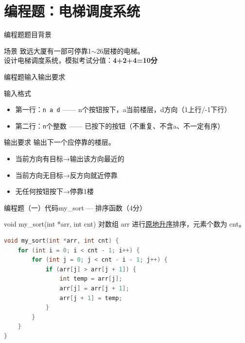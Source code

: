 \section{编程题：电梯调度系统}

\begin{frame}{编程题}{题目背景}
    \begin{exampleblock}{场景}
        \footnotesize 致远大厦有一部可停靠1$\sim$26层楼的电梯。\\
        设计电梯调度系统，模拟考试分值：\textbf{4+2+4=10分}
    \end{exampleblock}
\end{frame}

\begin{frame}{编程题}{输入输出要求}
    \begin{block}{输入格式}
        \footnotesize
        \begin{itemize}
            \setlength{\itemsep}{0pt}
            \item 第一行：\texttt{n a d} —— n个按钮按下，a当前楼层，d方向（1上行/-1下行）
            \item 第二行：\texttt{n}个整数 —— 已按下的按钮（不重复、不含a、不一定有序）
        \end{itemize}
    \end{block}
    \begin{block}{输出要求}
        \footnotesize 输出下一个应停靠的楼层。
        \begin{itemize}
            \setlength{\itemsep}{0pt}
            \item 当前方向有目标→输出该方向最近的
            \item 当前方向无目标→反方向就近停靠
            \item 无任何按钮按下→停靠1楼
        \end{itemize}
    \end{block}
\end{frame}

\begin{frame}[fragile]{编程题（一）代码}{my\_sort — 排序函数（4分）}
    \begin{exampleblock}{void my\_sort(int *arr, int cnt)}
        对数组 arr 进行\underline{原地升序}排序，元素个数为 cnt。
    \end{exampleblock}
    \begin{lstlisting}[language=C]
void my_sort(int *arr, int cnt) {
    for (int i = 0; i < cnt - 1; i++) {
        for (int j = 0; j < cnt - i - 1; j++) {
            if (arr[j] > arr[j + 1]) {
                int temp = arr[j];
                arr[j] = arr[j + 1];
                arr[j + 1] = temp;
            }
        }
    }
}
\end{lstlisting}
\end{frame}

